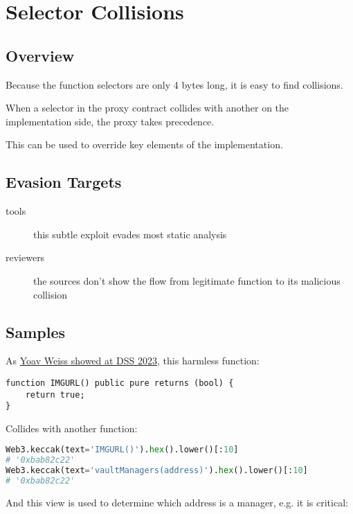 \section{Selector Collisions} \label{sec:selector-collisions}

\subsection{Overview}

Because the function selectors are only 4 bytes long, it is easy to find collisions.

When a selector in the proxy contract collides with another on the implementation side, the proxy takes precedence.

This can be used to override key elements of the implementation.

\subsection{Evasion Targets}

\begin{description}
\item[tools]{this subtle exploit evades most static analysis}
\item[reviewers]{the sources don't show the flow from legitimate function to its malicious collision}
\end{description}

\subsection{Samples}

As \href{https://www.youtube.com/watch?v=l1wjRy2BYPg}{Yoav Weiss showed at DSS 2023}, this harmless function:

\begin{lstlisting}[language=Solidity]
function IMGURL() public pure returns (bool) {
    return true;
}
\end{lstlisting}

Collides with another function:

\begin{lstlisting}[language=Python]
Web3.keccak(text='IMGURL()').hex().lower()[:10]
# '0xbab82c22'
Web3.keccak(text='vaultManagers(address)').hex().lower()[:10]
# '0xbab82c22'
\end{lstlisting}

And this view is used to determine which address is a manager, e.g. it is critical:

